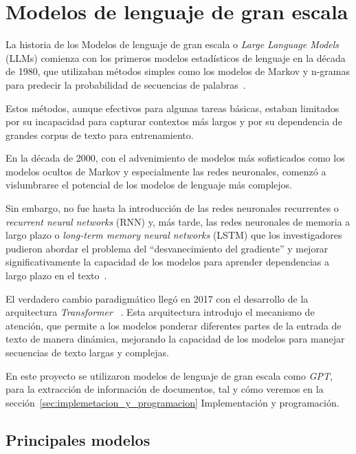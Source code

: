 \section{Modelos de lenguaje de gran escala}

La historia de los Modelos de lenguaje de gran escala o \textit{Large Language Models} (LLMs) comienza con los
primeros modelos estadísticos de lenguaje en la década de 1980, que utilizaban métodos simples como los modelos de
Markov y n-gramas para predecir la probabilidad de secuencias de palabras~\cite{article_jelinek_1997}.

Estos métodos, aunque efectivos para algunas tareas básicas, estaban limitados por su incapacidad para capturar
contextos más largos y por su dependencia de grandes corpus de texto para entrenamiento.

En la década de 2000, con el advenimiento de modelos más sofisticados como los modelos ocultos de Markov y especialmente
las redes neuronales, comenzó a vislumbrarse el potencial de los modelos de lenguaje más complejos.

Sin embargo, no fue hasta la introducción de las redes neuronales recurrentes o \textit{recurrent neural networks} (RNN)
y, más tarde, las redes neuronales de memoria a largo plazo o \textit{long-term memory neural networks} (LSTM) que
los investigadores pudieron abordar el problema del ``desvanecimiento del gradiente'' y mejorar significativamente la
capacidad de los modelos para aprender dependencias a largo plazo en el texto~\cite{article_hochreiter_1997}.

El verdadero cambio paradigmático llegó en 2017 con el desarrollo de la arquitectura \textit{Transformer}
~\cite{article_vaswani_2017}.
Esta arquitectura introdujo el mecanismo de atención, que permite a los modelos ponderar diferentes partes de la entrada
de texto de manera dinámica, mejorando la capacidad de los modelos para manejar secuencias de texto largas y complejas.

En este proyecto se utilizaron modelos de lenguaje de gran escala como \textit{GPT}, para la extracción de información
de documentos, tal y cómo veremos en la sección~\ref{sec:implemetacion_y_programacion} Implementación y programación.

\subsection*{Principales modelos}


